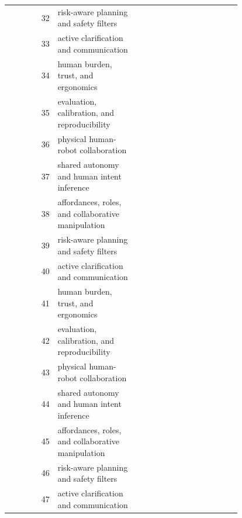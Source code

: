 \documentclass{article}
\begin{document}
\begin{longtable}{r p{0.34\linewidth} p{0.45\linewidth}}
32 & risk-aware planning and safety filters & \citep{katsampirissalgado2024advancing94,shi2022a95,babar2025a96} \\
33 & active clarification and communication & \citep{liau2020task97,you2024evolution98,nikolaidis2018planning99} \\
34 & human burden, trust, and ergonomics & \citep{gualtieri2021methodology100,hopko2021effect101,upasani2023eyetracking102} \\
35 & evaluation, calibration, and reproducibility & \citep{shibata2003emergence103,li2024unleashing104,rahman2019cognitive105} \\
36 & physical human-robot collaboration & \citep{awashreh2025the106,liu2019humanrobot107,zhang2023early108} \\
37 & shared autonomy and human intent inference & \citep{dijk2023the109,yang2023collaborative110,dani2020humanintheloop111} \\
38 & affordances, roles, and collaborative manipulation & \citep{halim2025hybrid112,kalatzis2023a113,digo2020collection114} \\
39 & risk-aware planning and safety filters & \citep{ciccarelli2024advancing115,maurtua2017humanrobot116,zhang2023a117} \\
40 & active clarification and communication & \citep{you2024a118,nikolaidis2017humanrobot119,roveda2022qlearningbased120} \\
41 & human burden, trust, and ergonomics & \citep{montini2023a121,chacon2021usability122,wong2023vision123} \\
42 & evaluation, calibration, and reproducibility & \citep{kim2019semantic124,garcia2023deep125,nikolakis2019a126} \\
43 & physical human-robot collaboration & \citep{jinda127,teyssier2021humanlike128,chan2025improving129} \\
44 & shared autonomy and human intent inference & \citep{zakka2021userinteractive130,yu2023mutual131,sanna2022bari132} \\
45 & affordances, roles, and collaborative manipulation & \citep{azadeh2023zoning133,brecelj2023stable134,aaltonen2018refining135} \\
46 & risk-aware planning and safety filters & \citep{amayamejia2022visionbased136,tuli2021knowledgebased137,sadrfaridpour2017collaborative138} \\
47 & active clarification and communication & \citep{ref2024affordance139,cil2020mathematical140,alhaji2021trust141} \\

\end{longtable}
\end{document}
